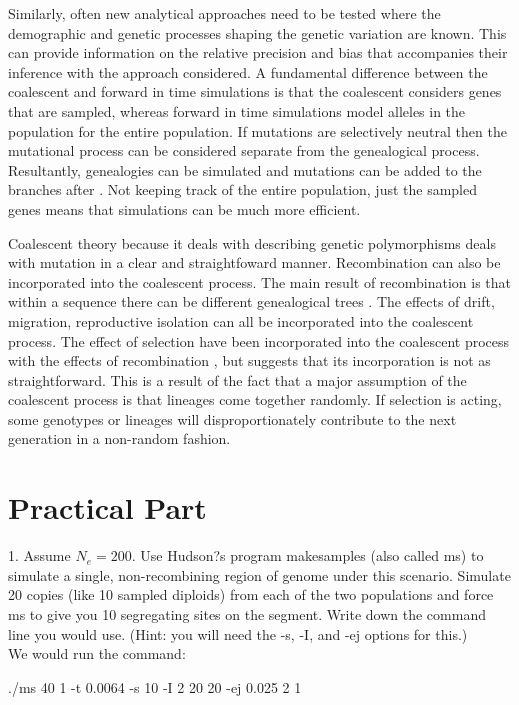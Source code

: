 \documentclass[11pt, oneside]{article}
\begin{document}
	Similarly, often new analytical approaches need to be tested where the demographic and genetic
processes shaping the genetic variation are known. This can provide information on the relative precision
and bias that accompanies their inference with the approach considered. A fundamental difference between the 
coalescent and forward in time simulations is that the coalescent considers genes that are sampled, whereas
forward in time simulations model alleles in the population for the entire population. If mutations are selectively neutral 
then the mutational process can be considered separate from the genealogical process. 
Resultantly, genealogies can be simulated and mutations can be added to the branches 
after \citep{Rosenberg2002}. Not keeping track of the entire population, just the sampled genes means that
simulations can be much more efficient. 

	Coalescent theory because it deals with describing genetic polymorphisms deals with mutation in a 
clear and straightfoward manner. Recombination can also be incorporated into the coalescent process. 
The main result of recombination is that within a sequence there can be different genealogical 
trees \citep{Rosenberg2002}. The effects of drift, migration, reproductive isolation can all be incorporated
into the coalescent process. The effect of selection have been incorporated into the coalescent process with the 
effects of recombination \citep{Hudson1988}, but \citet{Rosenberg2002} suggests that its incorporation is 
not as straightforward. This is a result of the fact that a major assumption of the coalescent process is that
lineages come together randomly. If selection is acting, some genotypes or lineages will disproportionately 
contribute to the next generation in a non-random fashion. 


\section{Practical Part}
1. Assume $N_e = 200$. Use Hudson?s program makesamples (also called ms) to simulate a single, 
non-recombining region of genome under this scenario. Simulate 20 copies (like 10 sampled diploids) 
from each of the two populations and force ms to give you 10 segregating sites on the segment. 
Write down the command line you would use. (Hint: you will need the -s, -I, and -ej options for this.)\\

\noindent
We would run the command:

\noindent
./ms 40 1 -t 0.0064 -s 10 -I 2 20 20 -ej 0.025 2 1 \\
\end{document}
